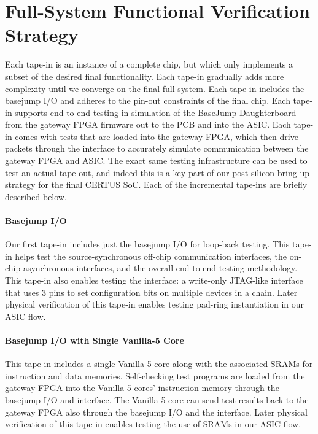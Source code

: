 
\section{Full-System Functional Verification Strategy}
\label{sec-full-sys-functional}

Each tape-in is an instance of a complete chip, but which only implements
a subset of the desired final functionality. Each tape-in gradually adds
more complexity until we converge on the final full-system. Each tape-in
includes the basejump I/O and adheres to the pin-out constraints of the
final chip. Each tape-in supports end-to-end testing in simulation of the
BaseJump Daughterboard from the gateway FPGA firmware out to the PCB and
into the ASIC. Each tape-in comes with tests that are loaded into the
gateway FPGA, which then drive packets through the 
interface to accurately simulate communication between the gateway FPGA
and ASIC. The exact same testing infrastructure can be used to test an
actual tape-out, and indeed this is a key part of our post-silicon
bring-up strategy for the final CERTUS SoC. Each of the incremental
tape-ins are briefly described below.

\paragraph{Basejump I/O}
Our first tape-in includes just the basejump I/O for loop-back testing.
This tape-in helps test the source-synchronous off-chip communication
interfaces, the on-chip asynchronous interfaces, and the overall
end-to-end testing methodology. This tape-in also enables testing the
 interface: a write-only JTAG-like interface that uses 3
pins to set configuration bits on multiple devices in a chain. Later
physical verification of this tape-in enables testing pad-ring
instantiation in our ASIC flow.

\paragraph{Basejump I/O with Single Vanilla-5 Core}
This tape-in includes a single Vanilla-5 core along with the associated
SRAMs for instruction and data memories. Self-checking test programs are
loaded from the gateway FPGA into the Vanilla-5 cores' instruction memory
through the basejump I/O and  interface. The Vanilla-5 core
can send test results back to the gateway FPGA also through the basejump
I/O and the  interface. Later physical verification of this
tape-in enables testing the use of SRAMs in our ASIC flow.

